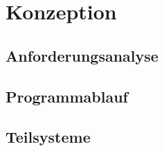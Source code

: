 \chapter{Konzeption}
\label{chapter3}


\section{Anforderungsanalyse}
\label{chapter3-Anforderungsanalyse}


\section{Programmablauf}
\label{chapter3-Programmablauf}


\section{Teilsysteme}
\label{chapter3-Teilsysteme}